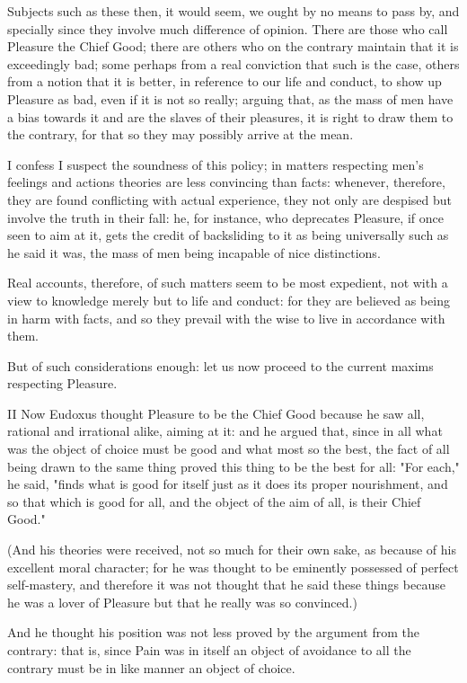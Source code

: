 Subjects such as these then, it would seem, we ought by no means to pass
by, and specially since they involve much difference of opinion. There
are those who call Pleasure the Chief Good; there are others who on the
contrary maintain that it is exceedingly bad; some perhaps from a real
conviction that such is the case, others from a notion that it is
better, in reference to our life and conduct, to show up Pleasure as
bad, even if it is not so really; arguing that, as the mass of men have
a bias towards it and are the slaves of their pleasures, it is right to
draw them to the contrary, for that so they may possibly arrive at the
mean.

I confess I suspect the soundness of this policy; in matters respecting
men's feelings and actions theories are less convincing than facts:
whenever, therefore, they are found conflicting with actual experience,
they not only are despised but involve the truth in their fall: he, for
instance, who deprecates Pleasure, if once seen to aim at it, gets the
credit of backsliding to it as being universally such as he said it was,
the mass of men being incapable of nice distinctions.

Real accounts, therefore, of such matters seem to be most expedient, not
with a view to knowledge merely but to life and conduct: for they are
believed as being in harm with facts, and so they prevail with the wise
to live in accordance with them.

But of such considerations enough: let us now proceed to the current
maxims respecting Pleasure.

II Now Eudoxus thought Pleasure to be the Chief Good because he saw all,
rational and irrational alike, aiming at it: and he argued that, since
in all what was the object of choice must be good and what most so the
best, the fact of all being drawn to the same thing proved this thing to
be the best for all: "For each," he said, "finds what is good for itself
just as it does its proper nourishment, and so that which is good for
all, and the object of the aim of all, is their Chief Good."

(And his theories were received, not so much for their own sake, as
because of his excellent moral character; for he was thought to be
eminently possessed of perfect self-mastery, and therefore it was not
thought that he said these things because he was a lover of Pleasure but
that he really was so convinced.)

And he thought his position was not less proved by the argument from the
contrary: that is, since Pain was in itself an object of avoidance to
all the contrary must be in like manner an object of choice.

